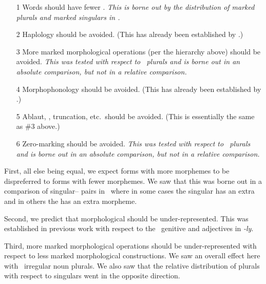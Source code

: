 \documentclass[output=paper,
modfonts
]{LSP/langsci}
\begin{document}
\begin{exe}
\ex \begin{itemize}
\item[1] Words should have fewer . \emph{This is borne out by the distribution of marked plurals and marked singulars in \w.}

\item[2] Haplology should be avoided. (This has already been established by \citealt{inopt.phon}.)

\item[3] More marked morphological operations (per the hierarchy above) should be avoided. \emph{This was tested with respect to \e\ plurals and is borne out in an absolute comparison, but not in a relative comparison.}

\item[4] Morphophonology should be avoided. (This has already been established by \citealt{inopt}.)

\item[5] Ablaut, , truncation, etc.\ should be avoided. (This is essentially the same as \#3 above.)

\item[6] Zero-marking should be avoided. \emph{This was tested with respect to \e\ plurals and is borne out in an absolute comparison, but not in a relative comparison.}

\end{itemize}
\end{exe}

First, all else being equal, we expect forms with more morphemes to be dispreferred to forms with fewer morphemes. We saw that this was borne out in a comparison of singular-- pairs in \w\ where in some cases the singular has an extra  and in others the  has an extra morpheme.

Second, we predict that morphological  should be under-represented. This was established in previous work with respect to the \e\ genitive  and adjectives in \emph{-ly}.

Third, more marked morphological operations should be under-represented with respect to less marked morphological constructions. We saw an overall effect here with \e\ irregular noun plurals. We also saw that the relative distribution of plurals with respect to singulars went in the opposite direction.
\end{document}
